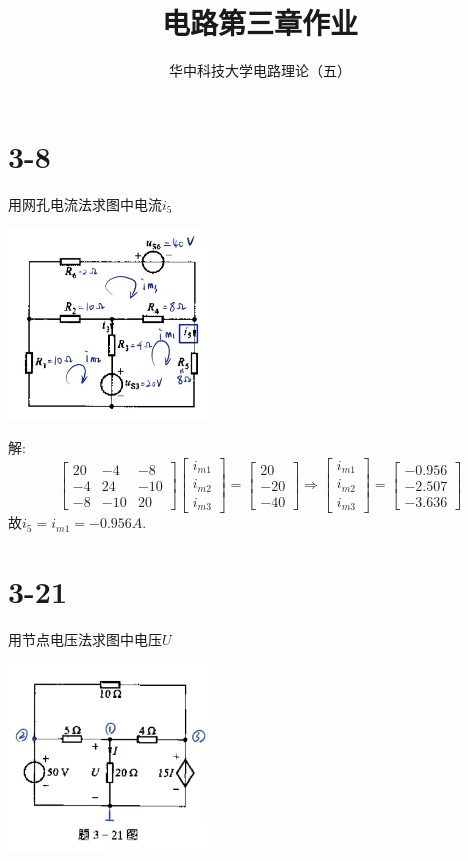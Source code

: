 \documentclass{article}
\title{电路第三章作业}
\author{华中科技大学电路理论（五）}
\date{}
\begin{document}
\maketitle
\section*{3-8}
用网孔电流法求图中电流$i_5$
\begin{center}
\includegraphics[width=0.4\textwidth,height=0.2\textheight]{3-8.jpg}
\end{center}

解:
\[
\begin{bmatrix}
    20&-4&-8\\
    -4&24&-10\\
    -8&-10&20
\end{bmatrix}
\begin{bmatrix}
    i_{m1}\\
    i_{m2}\\
    i_{m3}
\end{bmatrix}
=\begin{bmatrix}
    20\\
    -20\\
    -40
\end{bmatrix}
\Rightarrow
\begin{bmatrix}
    i_{m1}\\
    i_{m2}\\
    i_{m3}
\end{bmatrix}
=\begin{bmatrix}
    -0.956\\
    -2.507\\
    -3.636
\end{bmatrix}
\]
故$i_5=i_{m1}=-0.956A$.
\section*{3-21}
用节点电压法求图中电压$U$
\begin{center}
\includegraphics[width=0.4\textwidth,height=0.2\textheight]{3-21.jpg}
\end{center}
\end{document}
